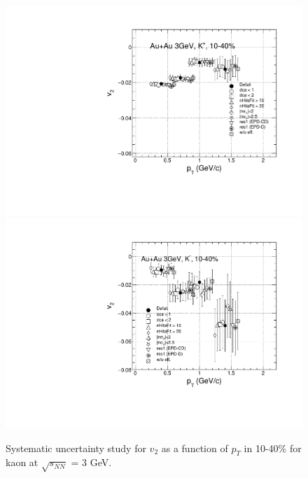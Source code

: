 \begin{figure}[h]
\includegraphics[scale=0.4]{chapter3/fig/sys/kaon/v2pt_kp_sys.pdf}
\includegraphics[scale=0.4]{chapter3/fig/sys/kaon/v2pt_km_sys.pdf}
\caption{Systematic uncertainty study for $v_{2}$ as a function of $p_{T}$ in 10-40\% for kaon at $\sqrt{s_{NN}}$ = 3 GeV.}
\label{pion_v1y_sys}
\end{figure}


